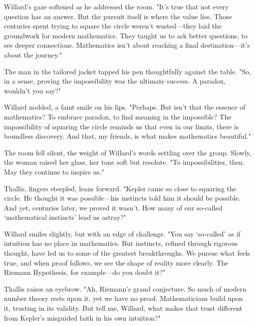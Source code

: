 \smallskip

Willard’s gaze softened as he addressed the room.  
"It’s true that not every question has an answer. But the pursuit itself is where the value lies. Those centuries spent trying to square the circle weren’t wasted—they laid the groundwork for modern mathematics. They taught us to ask better questions, to see deeper connections. Mathematics isn’t about reaching a final destination—it’s about the journey."

\smallskip

The man in the tailored jacket tapped his pen thoughtfully against the table.  
"So, in a sense, proving the impossibility was the ultimate success. A paradox, wouldn’t you say?"

\smallskip

Willard nodded, a faint smile on his lips.  
"Perhaps. But isn’t that the essence of mathematics? To embrace paradox, to find meaning in the impossible? The impossibility of squaring the circle reminds us that even in our limits, there is boundless discovery. And that, my friends, is what makes mathematics beautiful."

\smallskip

The room fell silent, the weight of Willard’s words settling over the group. Slowly, the woman raised her glass, her tone soft but resolute.  
"To impossibilities, then. May they continue to inspire us."



\smallskip

Thallis, fingers steepled, leans forward.  
"Kepler came so close to squaring the circle. He thought it was possible—his instincts told him it should be possible. And yet, centuries later, we proved it wasn’t. How many of our so-called ‘mathematical instincts’ lead us astray?"

\smallskip

Willard smiles slightly, but with an edge of challenge.  
"You say ‘so-called’ as if intuition has no place in mathematics. But instincts, refined through rigorous thought, have led us to some of the greatest breakthroughs. We pursue what feels true, and when proof follows, we see the shape of reality more clearly. The Riemann Hypothesis, for example—do you doubt it?"

\smallskip

Thallis raises an eyebrow.  
"Ah, Riemann’s grand conjecture. So much of modern number theory rests upon it, yet we have no proof. Mathematicians build upon it, trusting in its validity. But tell me, Willard, what makes that trust different from Kepler’s misguided faith in his own intuition?"

